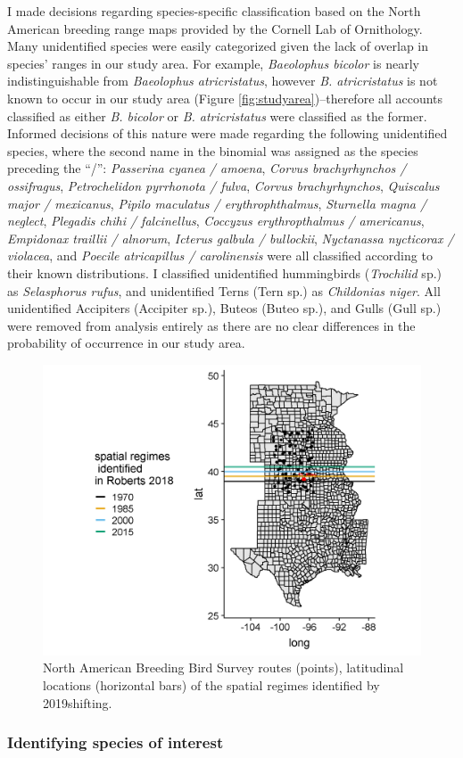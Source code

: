 \documentclass[print]{nuthesis}
\begin{document}
I made decisions regarding species-specific classification based on the North American breeding range maps provided by the Cornell Lab of Ornithology. Many unidentified species were easily categorized given the lack of overlap in species' ranges in our study area. For example, \emph{Baeolophus bicolor} is nearly indistinguishable from \emph{Baeolophus atricristatus}, however \emph{B. atricristatus} is not known to occur in our study area (Figure \ref{fig:studyarea})--therefore all accounts classified as either \emph{B. bicolor} or \emph{B. atricristatus} were classified as the former. Informed decisions of this nature were made regarding the following unidentified species, where the second name in the binomial was assigned as the species preceding the ``/'': \emph{Passerina cyanea / amoena}, \emph{Corvus brachyrhynchos / ossifragus}, \emph{Petrochelidon pyrrhonota / fulva}, \emph{Corvus brachyrhynchos}, \emph{Quiscalus major / mexicanus}, \emph{Pipilo maculatus / erythrophthalmus}, \emph{Sturnella magna / neglect}, \emph{Plegadis chihi / falcinellus}, \emph{Coccyzus erythropthalmus / americanus}, \emph{Empidonax traillii / alnorum}, \emph{Icterus galbula / bullockii}, \emph{Nyctanassa nycticorax / violacea}, and \emph{Poecile atricapillus / carolinensis} were all classified according to their known distributions. I classified unidentified hummingbirds (\emph{Trochilid} sp.) as \emph{Selasphorus rufus}, and unidentified Terns (Tern sp.) as \emph{Childonias niger}. All unidentified Accipiters (Accipiter sp.), Buteos (Buteo sp.), and Gulls (Gull sp.) were removed from analysis entirely as there are no clear differences in the probability of occurrence in our study area.
\begin{figure}
\includegraphics[width=0.85\linewidth]{.//chapterFiles/discontinuityAnalysis/figsCalledInDiss/routes_spatRegimeLines2} \caption{North American Breeding Bird Survey routes (points), latitudinal locations (horizontal bars) of the spatial regimes identified by \@roberts2019shifting.}\label{fig:routesWithSpatRegimes}
\end{figure}
\hypertarget{identifying-species-of-interest}{%
\subsubsection{Identifying species of interest}\label{identifying-species-of-interest}}
\end{document}
